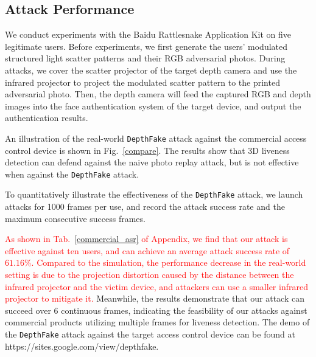 
\subsection{Attack Performance}
We conduct experiments with the Baidu Rattlesnake Application Kit on five legitimate users.
Before experiments, we first generate the users' modulated structured light scatter patterns and their RGB adversarial photos.
During attacks, we cover the scatter projector of the target depth camera and use the infrared projector to project the modulated scatter pattern to the printed adversarial photo. Then, the depth camera will feed the captured RGB and depth images into the face authentication system of the target device, and output the authentication results.

An illustration of the real-world \texttt{DepthFake} attack against the commercial access control device is shown in Fig.~\ref{compare}. The results show that 3D liveness detection can defend against the naive photo replay attack, but is not effective when against the \texttt{DepthFake} attack. 

To quantitatively illustrate the effectiveness of the \texttt{DepthFake} attack,  we launch attacks for 1000 frames per use, and record the attack success rate and the maximum consecutive success frames.

\textcolor{red}{As shown in Tab.~\ref{commercial_asr} of Appendix, we find that our attack is effective against ten users, and can achieve an average attack success rate of $61.16\%$. 
Compared to the simulation, the performance decrease in the real-world setting is due to the projection distortion caused by the distance between the infrared projector and the victim device, and attackers can use a smaller infrared projector to mitigate it.}
Meanwhile, the results demonstrate that our attack can succeed over 6 continuous frames, indicating the feasibility of our attacks against commercial products utilizing multiple frames for liveness detection.  The demo of the  \texttt{DepthFake} attack against the target access control device can be found at https://sites.google.com/view/depthfake.

